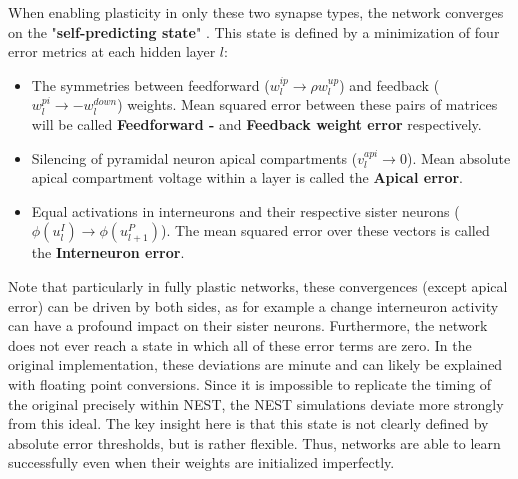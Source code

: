 When enabling plasticity in only these two synapse types, the network converges on the "\textbf{self-predicting state}"
\citep{sacramento2018dendritic}. This state is defined by a minimization of four error metrics at each hidden layer $l$:

\begin{itemize}
  \item The symmetries between feedforward ($w_l^{ip} \rightarrow \rho w_l^{up}$) and feedback ($w_l^{pi} \rightarrow
        -w_l^{down}$) weights. Mean squared error between these pairs of matrices will be called \textbf{Feedforward - }
        and \textbf{Feedback weight error} respectively.
  \item Silencing of pyramidal neuron apical compartments ($v_l^{api} \rightarrow 0$). Mean absolute apical compartment
        voltage within a layer is called the \textbf{Apical error}.
  \item Equal activations in interneurons and their respective sister neurons ($\phi (u_l^I) \rightarrow \phi
        (u_{l+1}^P)$). The mean squared error over these vectors is called the \textbf{Interneuron error}.
\end{itemize}

Note that particularly in fully plastic networks, these convergences (except apical error) can be driven by both sides,
as for example a change interneuron activity can have a profound impact on their sister neurons. Furthermore, the
network does not ever reach a state in which all of these error terms are zero. In the original implementation, these
deviations are minute and can likely be explained with floating point conversions. Since it is impossible to replicate
the timing of the original precisely within NEST, the NEST simulations deviate more strongly from this ideal. The key
insight here is that this state is not clearly defined by absolute error thresholds, but is rather flexible. Thus,
networks are able to learn successfully even when their weights are initialized imperfectly. 


